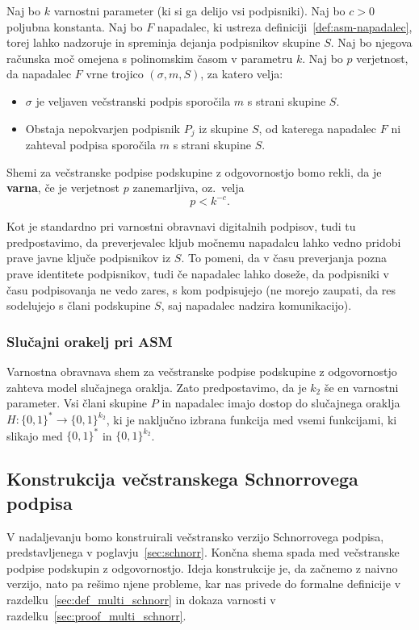 \documentclass[isrm2, tisk]{fmfdelo}
\begin{document}
\begin{definicija}
\label{def:asm-varnost}
    Naj bo $k$ varnostni parameter (ki si ga delijo vsi podpisniki). Naj bo $c > 0$ poljubna konstanta. 
    Naj bo $F$ napadalec, ki ustreza definiciji~\ref{def:asm-napadalec}, torej lahko nadzoruje in
    spreminja dejanja podpisnikov skupine $S$. Naj bo njegova računska moč omejena s polinomskim časom
    v parametru $k$. Naj bo $p$ verjetnost, da napadalec $F$ vrne trojico $(\sigma, m, S)$, za katero velja: 
    \begin{itemize}
        \item $\sigma$ je veljaven večstranski podpis sporočila $m$ s strani skupine $S$.
        \item Obstaja nepokvarjen podpisnik $P_j$ iz skupine $S$, od katerega napadalec $F$ ni zahteval podpisa 
            sporočila $m$ s strani skupine $S$.
    \end{itemize}
    Shemi za večstranske 
    podpise podskupine z odgovornostjo bomo rekli, da je \textbf{varna}, če je verjetnost $p$ zanemarljiva,
    oz.\ velja
    $$ 
    p < k^{-c}.
    $$
\end{definicija}

Kot je standardno pri varnostni obravnavi digitalnih podpisov, tudi tu predpostavimo, da preverjevalec
kljub močnemu napadalcu lahko vedno pridobi prave javne ključe podpisnikov iz $S$. To pomeni, da
v času preverjanja pozna prave identitete podpisnikov, tudi če napadalec lahko doseže, da podpisniki
v času podpisovanja ne vedo zares, s kom podpisujejo (ne morejo zaupati, da res sodelujejo s člani
podskupine $S$, saj napadalec nadzira komunikacijo).

\subsubsection{Slučajni orakelj pri ASM}
Varnostna obravnava shem za večstranske podpise podskupine z odgovornostjo zahteva model slučajnega
oraklja. Zato predpostavimo, da je $k_2$ še en varnostni parameter. Vsi člani skupine $P$ in
napadalec imajo dostop do slučajnega oraklja $H: \{0, 1\}^* \rightarrow \{0, 1\}^{k_2}$, ki je
naključno izbrana funkcija med vsemi funkcijami, ki slikajo med $\{0, 1\}^*$ in $\{0, 1\}^{k_2}$.

\subsection{Konstrukcija večstranskega Schnorrovega podpisa}
V nadaljevanju bomo konstruirali večstransko verzijo Schnorrovega podpisa, predstavljenega v
poglavju~\ref{sec:schnorr}. Končna shema spada med večstranske podpise podskupin z odgovornostjo.
Ideja konstrukcije je, da začnemo z naivno verzijo, nato pa rešimo njene probleme, kar nas
privede do formalne definicije v razdelku~\ref{sec:def_multi_schnorr} in dokaza varnosti v
razdelku~\ref{sec:proof_multi_schnorr}.
\end{document}
